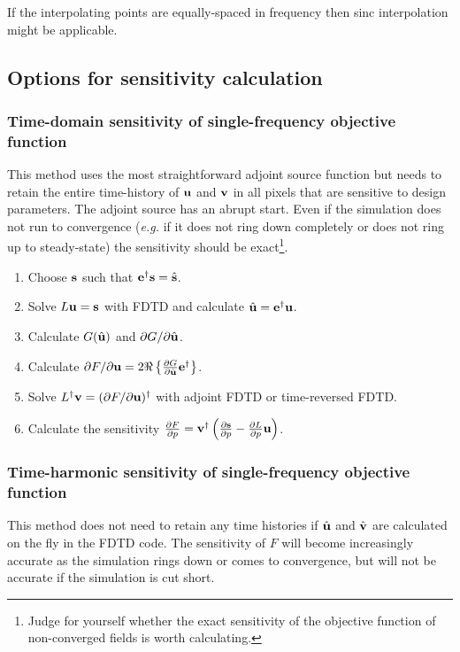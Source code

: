 If the interpolating points are equally-spaced in frequency then sinc interpolation might be applicable.


\subsection{Options for sensitivity calculation}

\subsubsection{Time-domain sensitivity of single-frequency objective function}

This method uses the most straightforward adjoint source function but needs to retain the entire time-history of $\textbf{u}$ and $\textbf{v}$ in all pixels that are sensitive to design parameters.  The adjoint source has an abrupt start.  Even if the simulation does not run to convergence (\emph{e.g.} if it does not ring down completely or does not ring up to steady-state) the sensitivity should be exact\footnote{Judge for yourself whether the exact sensitivity of the objective function of non-converged fields is worth calculating.}.

\begin{enumerate}
\item Choose $\textbf{s}$ such that $\textbf{e}^\dagger \textbf{s} = \hat{\textbf{s}}$.
\item Solve $L \textbf{u} = \textbf{s}$ with FDTD and calculate $\hat{\textbf{u}} = \textbf{e}^\dagger \textbf{u}$.
\item Calculate $G(\hat{\textbf{u}})$ and $\partial{G}/\partial{\hat{\textbf{u}}}$.
\item Calculate $\partial{F}/\partial{\textbf{u}} = 2 \Re \left\{ \frac{\partial{G}}{\partial{\hat{\textbf{u}}}} \textbf{e}^\dagger \right\}$.
\item Solve $L^\dagger \textbf{v} = (\partial{F}/\partial{\textbf{u}})^\dagger$ with adjoint FDTD or time-reversed FDTD.
\item Calculate the sensitivity $\frac{\partial{F}}{\partial{p}} = \textbf{v}^\dagger \left( \frac{\partial{\textbf{s}}}{\partial{p}} - \frac{\partial{L}}{\partial{p}} \textbf{u}\right)$.
\end{enumerate}

\subsubsection{Time-harmonic sensitivity of single-frequency objective function}

This method does not need to retain any time histories if $\hat{\textbf{u}}$ and $\hat{\textbf{v}}$ are calculated on the fly in the FDTD code.  The sensitivity of $F$ will become increasingly accurate as the simulation rings down or comes to convergence, but will not be accurate if the simulation is cut short.

